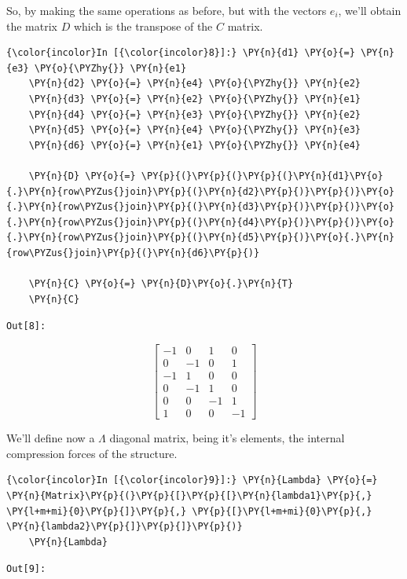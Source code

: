 So, by making the same operations as before, but with the vectors
\(e_i\), we'll obtain the matrix \(D\) which is the transpose of the
\(C\) matrix.

\begin{Verbatim}[commandchars=\\\{\}]
    {\color{incolor}In [{\color{incolor}8}]:} \PY{n}{d1} \PY{o}{=} \PY{n}{e3} \PY{o}{\PYZhy{}} \PY{n}{e1}
    \PY{n}{d2} \PY{o}{=} \PY{n}{e4} \PY{o}{\PYZhy{}} \PY{n}{e2}
    \PY{n}{d3} \PY{o}{=} \PY{n}{e2} \PY{o}{\PYZhy{}} \PY{n}{e1}
    \PY{n}{d4} \PY{o}{=} \PY{n}{e3} \PY{o}{\PYZhy{}} \PY{n}{e2}
    \PY{n}{d5} \PY{o}{=} \PY{n}{e4} \PY{o}{\PYZhy{}} \PY{n}{e3}
    \PY{n}{d6} \PY{o}{=} \PY{n}{e1} \PY{o}{\PYZhy{}} \PY{n}{e4}

    \PY{n}{D} \PY{o}{=} \PY{p}{(}\PY{p}{(}\PY{p}{(}\PY{n}{d1}\PY{o}{.}\PY{n}{row\PYZus{}join}\PY{p}{(}\PY{n}{d2}\PY{p}{)}\PY{p}{)}\PY{o}{.}\PY{n}{row\PYZus{}join}\PY{p}{(}\PY{n}{d3}\PY{p}{)}\PY{p}{)}\PY{o}{.}\PY{n}{row\PYZus{}join}\PY{p}{(}\PY{n}{d4}\PY{p}{)}\PY{p}{)}\PY{o}{.}\PY{n}{row\PYZus{}join}\PY{p}{(}\PY{n}{d5}\PY{p}{)}\PY{o}{.}\PY{n}{row\PYZus{}join}\PY{p}{(}\PY{n}{d6}\PY{p}{)}

    \PY{n}{C} \PY{o}{=} \PY{n}{D}\PY{o}{.}\PY{n}{T}
    \PY{n}{C}
\end{Verbatim}
\texttt{\color{outcolor}Out[{\color{outcolor}8}]:}


\begin{equation*}
    \left[\begin{matrix}-1 & 0 & 1 & 0\\0 & -1 & 0 & 1\\-1 & 1 & 0 & 0\\0 & -1 & 1 & 0\\0 & 0 & -1 & 1\\1 & 0 & 0 & -1\end{matrix}\right]
\end{equation*}



We'll define now a \(\Lambda\) diagonal matrix, being it's elements, the
internal compression forces of the structure.

\begin{Verbatim}[commandchars=\\\{\}]
    {\color{incolor}In [{\color{incolor}9}]:} \PY{n}{Lambda} \PY{o}{=} \PY{n}{Matrix}\PY{p}{(}\PY{p}{[}\PY{p}{[}\PY{n}{lambda1}\PY{p}{,} \PY{l+m+mi}{0}\PY{p}{]}\PY{p}{,} \PY{p}{[}\PY{l+m+mi}{0}\PY{p}{,} \PY{n}{lambda2}\PY{p}{]}\PY{p}{]}\PY{p}{)}
    \PY{n}{Lambda}
\end{Verbatim}
\texttt{\color{outcolor}Out[{\color{outcolor}9}]:}



